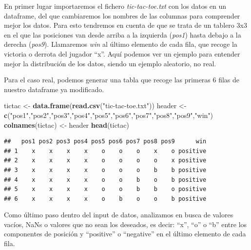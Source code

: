 \documentclass[
]{article}
\newenvironment{Shaded}{\begin{snugshade}}{\end{snugshade}}
\newcommand{\FunctionTok}[1]{\textcolor[rgb]{0.13,0.29,0.53}{\textbf{#1}}}
\newcommand{\NormalTok}[1]{#1}
\newcommand{\OtherTok}[1]{\textcolor[rgb]{0.56,0.35,0.01}{#1}}
\newcommand{\StringTok}[1]{\textcolor[rgb]{0.31,0.60,0.02}{#1}}
\begin{document}
En primer lugar importaremos el fichero \emph{tic-tac-toe.txt} con los
datos en un dataframe, del que cambiaremos los nombres de las columnas
para comprender mejor los datos. Para esto tendremos en cuenta de que se
trata de un tablero 3x3 en el que las posiciones van desde arriba a la
izquierda (\emph{pos1}) hasta debajo a la derecha (\emph{pos9}).
Llamaremos \emph{win} al último elemento de cada fila, que recoge la
victoria o derrota del jugador ``x''. Aquí podemos ver un ejemplo para
entender mejor la distribución de los datos, siendo un ejemplo
aleatorio, no real.

Para el caso real, podemos generar una tabla que recoge las primeras 6
filas de nuestro dataframe ya modificado.

\begin{Shaded}
\begin{Highlighting}[]
\NormalTok{tictac }\OtherTok{\textless{}{-}} \FunctionTok{data.frame}\NormalTok{(}\FunctionTok{read.csv}\NormalTok{(}\StringTok{"tic{-}tac{-}toe.txt"}\NormalTok{))}
\NormalTok{header }\OtherTok{\textless{}{-}} \FunctionTok{c}\NormalTok{(}\StringTok{"pos1"}\NormalTok{,}\StringTok{"pos2"}\NormalTok{,}\StringTok{"pos3"}\NormalTok{,}\StringTok{"pos4"}\NormalTok{,}\StringTok{"pos5"}\NormalTok{,}\StringTok{"pos6"}\NormalTok{,}\StringTok{"pos7"}\NormalTok{,}\StringTok{"pos8"}\NormalTok{,}\StringTok{"pos9"}\NormalTok{,}\StringTok{"win"}\NormalTok{)}
\FunctionTok{colnames}\NormalTok{(tictac) }\OtherTok{\textless{}{-}}\NormalTok{ header}
\FunctionTok{head}\NormalTok{(tictac)}
\end{Highlighting}
\end{Shaded}

\begin{verbatim}
##   pos1 pos2 pos3 pos4 pos5 pos6 pos7 pos8 pos9      win
## 1    x    x    x    x    o    o    o    x    o positive
## 2    x    x    x    x    o    o    o    o    x positive
## 3    x    x    x    x    o    o    o    b    b positive
## 4    x    x    x    x    o    o    b    o    b positive
## 5    x    x    x    x    o    o    b    b    o positive
## 6    x    x    x    x    o    b    o    o    b positive
\end{verbatim}

Como último paso dentro del input de datos, analizamos en busca de
valores vacíos, NaNs o valores que no sean los deseados, es decir:
``x'', ``o'' o ``b'' entre los componentes de posición y ``positive'' o
``negative'' en el último elemento de cada fila.
\end{document}
